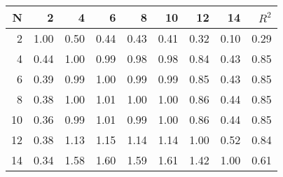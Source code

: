 \begin{tabular}{rrrrrrrrr}
\toprule
  N &     2 &     4 &     6 &     8 &    10 &    12 &    14 &  $R^2$ \\
\midrule
  2 &  1.00 &  0.50 &  0.44 &  0.43 &  0.41 &  0.32 &  0.10 &   0.29 \\
  4 &  0.44 &  1.00 &  0.99 &  0.98 &  0.98 &  0.84 &  0.43 &   0.85 \\
  6 &  0.39 &  0.99 &  1.00 &  0.99 &  0.99 &  0.85 &  0.43 &   0.85 \\
  8 &  0.38 &  1.00 &  1.01 &  1.00 &  1.00 &  0.86 &  0.44 &   0.85 \\
 10 &  0.36 &  0.99 &  1.01 &  0.99 &  1.00 &  0.86 &  0.44 &   0.85 \\
 12 &  0.38 &  1.13 &  1.15 &  1.14 &  1.14 &  1.00 &  0.52 &   0.84 \\
 14 &  0.34 &  1.58 &  1.60 &  1.59 &  1.61 &  1.42 &  1.00 &   0.61 \\
\bottomrule
\end{tabular}
